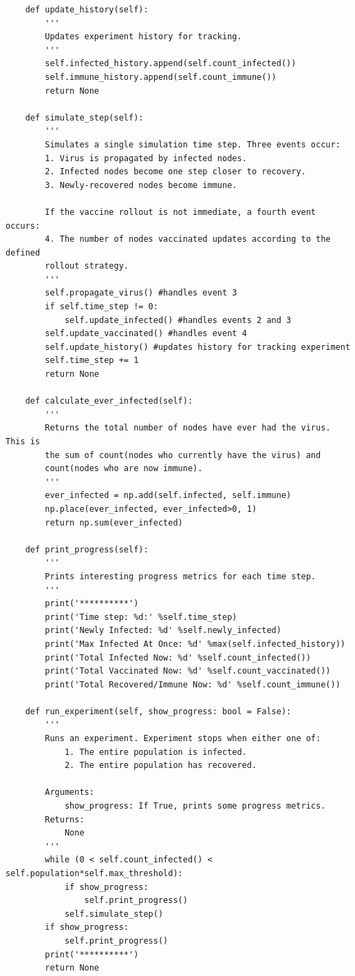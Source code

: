 \documentclass[psamsfonts]{amsart}
\theoremstyle{definition}
\theoremstyle{remark}
\numberwithin{equation}{section}
\begin{document}
\begin{verbatim}
    def update_history(self):
        '''
        Updates experiment history for tracking.
        '''
        self.infected_history.append(self.count_infected())
        self.immune_history.append(self.count_immune())
        return None

    def simulate_step(self):
        '''
        Simulates a single simulation time step. Three events occur:
        1. Virus is propagated by infected nodes.
        2. Infected nodes become one step closer to recovery.
        3. Newly-recovered nodes become immune.

        If the vaccine rollout is not immediate, a fourth event occurs:
        4. The number of nodes vaccinated updates according to the defined
        rollout strategy.
        '''
        self.propagate_virus() #handles event 3
        if self.time_step != 0:
            self.update_infected() #handles events 2 and 3
        self.update_vaccinated() #handles event 4
        self.update_history() #updates history for tracking experiment
        self.time_step += 1
        return None

    def calculate_ever_infected(self):
        '''
        Returns the total number of nodes have ever had the virus. This is
        the sum of count(nodes who currently have the virus) and
        count(nodes who are now immune).
        '''
        ever_infected = np.add(self.infected, self.immune)
        np.place(ever_infected, ever_infected>0, 1)
        return np.sum(ever_infected)

    def print_progress(self):
        '''
        Prints interesting progress metrics for each time step.
        '''
        print('**********')
        print('Time step: %d:' %self.time_step)
        print('Newly Infected: %d' %self.newly_infected)
        print('Max Infected At Once: %d' %max(self.infected_history))
        print('Total Infected Now: %d' %self.count_infected())
        print('Total Vaccinated Now: %d' %self.count_vaccinated())
        print('Total Recovered/Immune Now: %d' %self.count_immune())

    def run_experiment(self, show_progress: bool = False):
        '''
        Runs an experiment. Experiment stops when either one of:
            1. The entire population is infected.
            2. The entire population has recovered.

        Arguments:
            show_progress: If True, prints some progress metrics.
        Returns:
            None
        '''
        while (0 < self.count_infected() < self.population*self.max_threshold):
            if show_progress:
                self.print_progress()
            self.simulate_step()
        if show_progress:
            self.print_progress()
        print('**********')
        return None


\end{verbatim}
\end{document}
